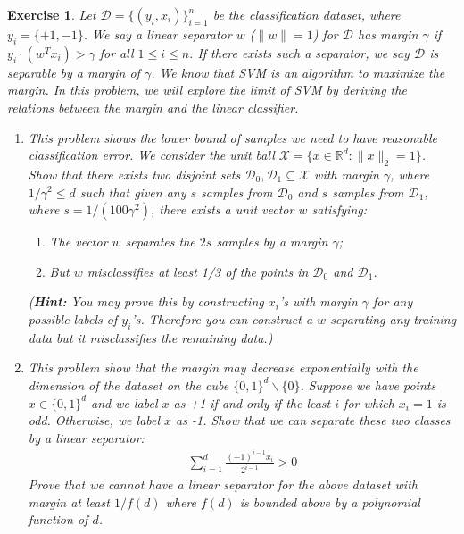 \documentclass[12pt]{article}
\theoremstyle{colon}
\newtheorem{exercise}{Exercise}
\begin{document}
\begin{exercise}
  Let $\mathcal{D} = \{ (y_i, x_i) \}_{i=1}^n$ be the classification dataset, where $y_i = \{ +1, -1\}$. We say a linear separator $w$ ($\lVert w \rVert = 1$) for $\mathcal{D}$ has margin $\gamma$ if $y_i \cdot (w^T x_i) > \gamma$ for all $1 \leq i \leq n$. If there exists such a separator, we say $\mathcal{D}$ is separable by a margin of $\gamma$. We know that SVM is an algorithm to maximize the margin. In this problem, we will explore the limit of SVM by deriving the relations between the margin and the linear classifier.
  \begin{enumerate}[label=\arabic*)]
    \item This problem shows the lower bound of samples we need to have reasonable classification error. We consider the unit ball $\mathcal{X} = \{ x \in \mathbb{R}^d : \lVert x \rVert_2 = 1 \}$. Show that there exists two disjoint sets $\mathcal{D}_0, \mathcal{D}_1 \subseteq \mathcal{X}$ with margin $\gamma$, where $1/\gamma^2 \leq d$ such that given any $s$ samples from $\mathcal{D}_0$ and $s$ samples from $\mathcal{D}_1$, where $s = 1/(100 \gamma^2)$, there exists a unit vector $w$ satisfying:
      \begin{enumerate}[label=\arabic*)]
        \item The vector $w$ separates the $2s$ samples by a margin $\gamma$;
        \item But $w$ misclassifies at least 1/3 of the points in $\mathcal{D}_0$ and $\mathcal{D}_1$.
      \end{enumerate}
      (\textbf{Hint:} You may prove this by constructing $x_i$'s with margin $\gamma$ for any possible labels of $y_i$'s. Therefore you can construct a $w$ separating any training data but it misclassifies the remaining data.)

    \item This problem show that the margin may decrease exponentially with the dimension of the dataset on the cube $\{0,1\}^d \backslash \{0\}$. Suppose we have points $x \in \{0,1\}^d$ and we label $x$ as +1 if and only if the least $i$ for which $x_i = 1$ is odd. Otherwise, we label $x$ as -1. Show that we can separate these two classes by a linear separator:
      \begin{gather*}
        \sum_{i=1}^d \frac{(-1)^{i-1} x_i}{2^{i-1}} > 0
      \end{gather*}
      Prove that we cannot have a linear separator for the above dataset with margin at least $1/f(d)$ where $f(d)$ is bounded above by a polynomial function of $d$.
  \end{enumerate}
\end{exercise}
\end{document}
